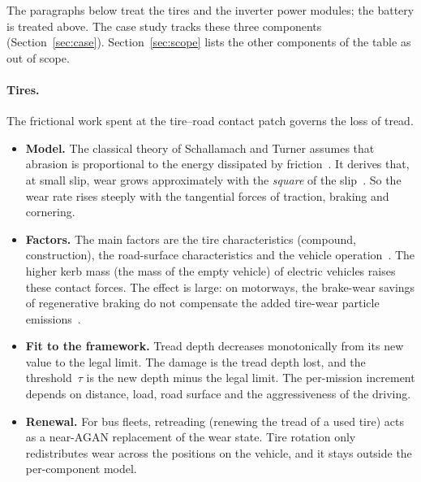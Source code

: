 \documentclass[11pt,a4paper]{article}
\theoremstyle{plain}
\theoremstyle{definition}
\theoremstyle{remark}
\begin{document}
The paragraphs below treat the tires and the inverter power modules; the battery is treated above.
The case study tracks these three components (Section~\ref{sec:case}).
Section~\ref{sec:scope} lists the other components of the table as out of scope.

\paragraph{Tires.}
The frictional work spent at the tire--road contact patch governs the loss of tread.
\begin{itemize}
  \item \textbf{Model.}
    The classical theory of Schallamach and Turner assumes that abrasion is proportional to the energy dissipated by friction~\cite[Eq.~7]{SchallamachTurner1960}.
    It derives that, at small slip, wear grows approximately with the \emph{square} of the slip~\cite[Eq.~19]{SchallamachTurner1960}.
    So the wear rate rises steeply with the tangential forces of traction, braking and cornering.
  \item \textbf{Factors.}
    The main factors are the tire characteristics (compound, construction), the road-surface characteristics and the vehicle operation~\cite[Sec.~2.1.2]{Fussell2022}.
    The higher kerb mass (the mass of the empty vehicle) of electric vehicles raises these contact forces.
    The effect is large: on motorways, the brake-wear savings of regenerative braking do not compensate the added tire-wear particle emissions~\cite[Sec.~6.1]{Fussell2022}.
  \item \textbf{Fit to the framework.}
    Tread depth decreases monotonically from its new value to the legal limit.
    The damage is the tread depth lost, and the threshold~$\tau$ is the new depth minus the legal limit.
    The per-mission increment depends on distance, load, road surface and the aggressiveness of the driving.
  \item \textbf{Renewal.}
    For bus fleets, retreading (renewing the tread of a used tire) acts as a near-AGAN replacement of the wear state.
    Tire rotation only redistributes wear across the positions on the vehicle, and it stays outside the per-component model.
\end{itemize}
\end{document}
